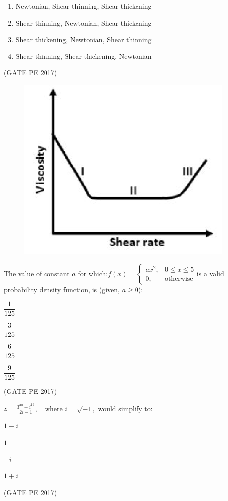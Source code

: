 \documentclass[journal,12pt,onecolumn]{IEEEtran}
\theoremstyle{remark}
\begin{document}
\begin{enumerate}
{\begin{enumerate}
\item Newtonian, Shear thinning, Shear thickening
\item Shear thinning, Newtonian, Shear thickening
\item Shear thickening, Newtonian, Shear thinning
\item Shear thinning, Shear thickening, Newtonian
\end{enumerate}
\hfill{(GATE PE 2017)}
\begin{figure}[h]
    \centering
    \includegraphics[width=0.5\columnwidth]{Graph_Q41.png}
\end{figure}
\item The value of constant $a$ for which:$ f(x) = \begin{cases}ax^2, & 0 \leq x \leq 5 \\0, & \text{otherwise}
\end{cases}$is a valid probability density function, is (given, $a \geq 0$):
\begin{enumerate}
\begin{multicols}{4}
\item $\dfrac{1}{125}$
\item $\dfrac{3}{125}$
\item $\dfrac{6}{125}$
\item $\dfrac{9}{125}$
\end{multicols}
\end{enumerate}
\hfill{(GATE PE 2017)}

\item $z = \frac{3^{30} - i^{19}}{2i - 1}, \quad \text{where } i = \sqrt{-1},$ would simplify to:
\begin{enumerate}
\begin{multicols}{4}
\item $1 - i$
\item $1$
\item $-i$
\item $1 + i$
\end{multicols}
\end{enumerate}
\hfill{(GATE PE 2017)}

}
\end{enumerate}
\end{document}
